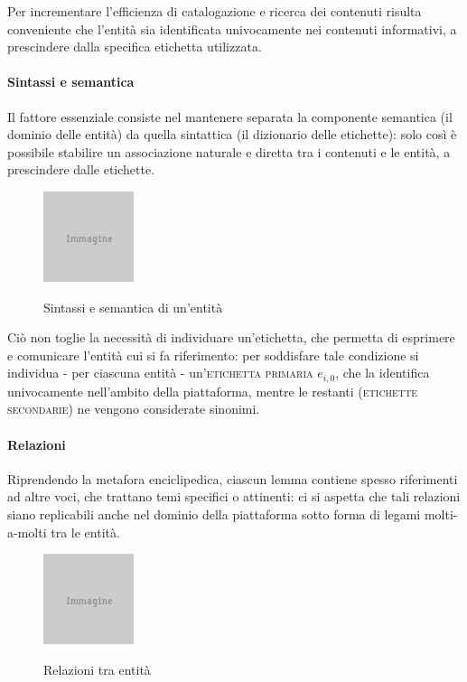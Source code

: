 Per incrementare l'efficienza di catalogazione e ricerca dei contenuti risulta conveniente che l'entità sia identificata univocamente nei contenuti informativi, a prescindere dalla specifica etichetta utilizzata.

\paragraph{Sintassi e semantica}
Il fattore essenziale consiste nel mantenere separata la componente semantica (il dominio delle entità) da quella sintattica (il dizionario delle etichette): solo così è possibile stabilire un associazione naturale e diretta tra i contenuti e le entità, a prescindere dalle etichette.

\begin{figure}[ht]
\begin{center}
\includegraphics{placeholder.png}
\label{fig:tesi:stage:fase-uno:entita-sintassi-semantica}
\caption{Sintassi e semantica di un'entità}
\end{center}
\end{figure}

Ciò non toglie la necessità di individuare un'etichetta, che permetta di esprimere e comunicare l'entità cui si fa riferimento: per soddisfare tale condizione si individua - per ciascuna entità - un'\textsc{etichetta primaria} $e_{i,0}$, che la identifica univocamente nell'ambito della piattaforma, mentre le restanti (\textsc{etichette secondarie}) ne vengono considerate sinonimi.


\paragraph{Relazioni}
Riprendendo la metafora enciclipedica, ciascun lemma contiene spesso riferimenti ad altre voci, che trattano temi specifici o attinenti: ci si aspetta che tali relazioni siano replicabili anche nel dominio della piattaforma sotto forma di legami molti-a-molti tra le entità.

\begin{figure}[ht]
\begin{center}
\includegraphics{placeholder.png}
\label{fig:tesi:stage:fase-uno:entita-relazioni}
\caption{Relazioni tra entità}
\end{center}
\end{figure}

